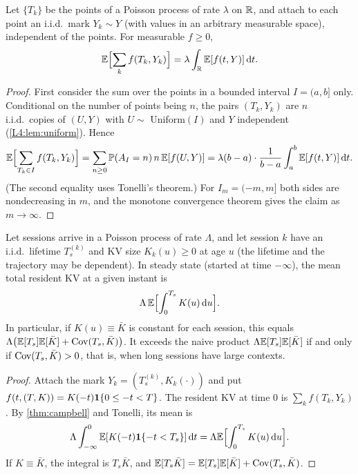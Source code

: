 \begin{theorem}\label{thm:campbell}
Let $\{T_k\}$ be the points of a Poisson process of rate $\lambda$ on $\mathbb{R}$, and
attach to each point an i.i.d.\ mark $Y_k\sim Y$ (with values in an arbitrary
measurable space), independent of the points. For measurable $f\ge0$,
\[
  \mathbb{E}\Bigl[\sum_k f(T_k,Y_k)\Bigr]=\lambda\int_{\mathbb{R}}\mathbb{E}[f(t,Y)]\,\mathrm{d} t .
\]
\end{theorem}

\begin{proof}
First consider the sum over the points in a bounded interval $I=(a,b]$ only.
Conditional on the number of points being $n$, the pairs $(T_k,Y_k)$ are $n$
i.i.d.\ copies of $(U,Y)$ with $U\sim$ Uniform$(I)$ and $Y$ independent
(\cref{L4:lem:uniform}). Hence
\[
  \mathbb{E}\Bigl[\sum_{T_k\in I}f(T_k,Y_k)\Bigr]
  =\sum_{n\ge0}\mathbb{P}(A_I=n)\,n\,\mathbb{E}[f(U,Y)]
  =\lambda(b-a)\cdot\frac{1}{b-a}\int_a^b\mathbb{E}[f(t,Y)]\,\mathrm{d} t .
\]
(The second equality uses Tonelli's theorem.) For $I_m=(-m,m]$ both sides are
nondecreasing in $m$, and the monotone convergence theorem gives the claim as
$m\to\infty$.
\end{proof}

\begin{corollary}\label{cor:resident-kv}
Let sessions arrive in a Poisson process of rate $\Lambda$, and let session $k$
have an i.i.d.\ lifetime $T_s^{(k)}$ and KV size $K_k(u)\ge0$ at age $u$ (the
lifetime and the trajectory may be dependent). In steady state (started at time
$-\infty$), the mean total resident KV at a given instant is
\[
  \Lambda\,\mathbb{E}\Bigl[\int_0^{T_s}K(u)\,\mathrm{d} u\Bigr].
\]
In particular, if $K(u)\equiv\bar K$ is constant for each session, this equals
$\Lambda\bigl(\mathbb{E}[T_s]\mathbb{E}[\bar K]+\operatorname{Cov}(T_s,\bar K)\bigr)$. It exceeds the naive
product $\Lambda\mathbb{E}[T_s]\mathbb{E}[\bar K]$ if and only if $\operatorname{Cov}(T_s,\bar K)>0$, that is,
when long sessions have large contexts.
\end{corollary}

\begin{proof}
Attach the mark $Y_k=(T_s^{(k)},K_k(\cdot))$ and put
$f(t,(T,K))=K(-t)\mathbf{1}\{0\le -t<T\}$. The resident KV at time $0$ is
$\sum_kf(T_k,Y_k)$. By \cref{thm:campbell} and Tonelli, its mean is
\[
  \Lambda\int_{-\infty}^0\mathbb{E}[K(-t)\mathbf{1}\{-t<T_s\}]\,\mathrm{d} t=\Lambda\mathbb{E}\Bigl[\int_0^{T_s}K(u)\,\mathrm{d} u\Bigr].
\]
If $K\equiv\bar K$, the integral is $T_s\bar K$, and
$\mathbb{E}[T_s\bar K]=\mathbb{E}[T_s]\mathbb{E}[\bar K]+\operatorname{Cov}(T_s,\bar K)$.
\end{proof}

